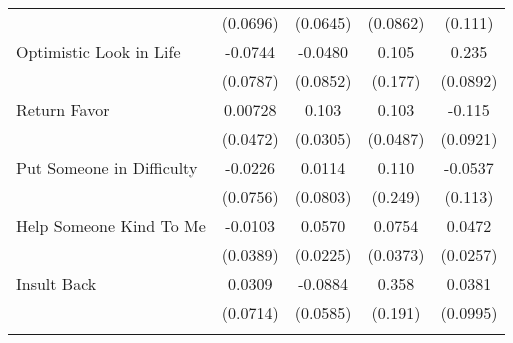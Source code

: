 {\begin{tabular}{l*{4}{c}}
            &    (0.0696)         &    (0.0645)         &    (0.0862)         &     (0.111)         \\
[1em]
Optimistic Look in Life&     -0.0744         &     -0.0480         &       0.105         &       0.235\sym{**} \\
            &    (0.0787)         &    (0.0852)         &     (0.177)         &    (0.0892)         \\
[1em]
Return Favor&     0.00728         &       0.103\sym{***}&       0.103\sym{*}  &      -0.115         \\
            &    (0.0472)         &    (0.0305)         &    (0.0487)         &    (0.0921)         \\
[1em]
Put Someone in Difficulty&     -0.0226         &      0.0114         &       0.110         &     -0.0537         \\
            &    (0.0756)         &    (0.0803)         &     (0.249)         &     (0.113)         \\
[1em]
Help Someone Kind To Me&     -0.0103         &      0.0570\sym{*}  &      0.0754\sym{*}  &      0.0472         \\
            &    (0.0389)         &    (0.0225)         &    (0.0373)         &    (0.0257)         \\
[1em]
Insult Back &      0.0309         &     -0.0884         &       0.358         &      0.0381         \\
            &    (0.0714)         &    (0.0585)         &     (0.191)         &    (0.0995)         \\
\hline\hline
{}\\
\end{tabular}
}
